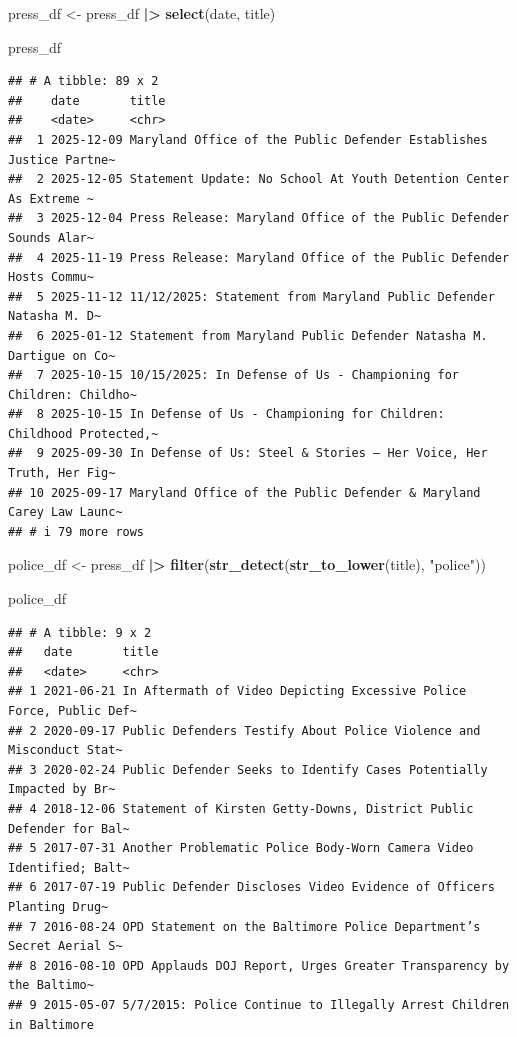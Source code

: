 \documentclass[
]{article}
\newenvironment{Shaded}{\begin{snugshade}}{\end{snugshade}}
\newcommand{\FunctionTok}[1]{\textcolor[rgb]{0.13,0.29,0.53}{\textbf{#1}}}
\newcommand{\NormalTok}[1]{#1}
\newcommand{\OtherTok}[1]{\textcolor[rgb]{0.56,0.35,0.01}{#1}}
\newcommand{\SpecialCharTok}[1]{\textcolor[rgb]{0.81,0.36,0.00}{\textbf{#1}}}
\newcommand{\StringTok}[1]{\textcolor[rgb]{0.31,0.60,0.02}{#1}}
\begin{document}
\begin{Shaded}
\begin{Highlighting}[]
\NormalTok{press\_df }\OtherTok{\textless{}{-}}\NormalTok{ press\_df }\SpecialCharTok{|\textgreater{}} \FunctionTok{select}\NormalTok{(date, title)}

\NormalTok{press\_df}
\end{Highlighting}
\end{Shaded}

\begin{verbatim}
## # A tibble: 89 x 2
##    date       title                                                             
##    <date>     <chr>                                                             
##  1 2025-12-09 Maryland Office of the Public Defender Establishes Justice Partne~
##  2 2025-12-05 Statement Update: No School At Youth Detention Center As Extreme ~
##  3 2025-12-04 Press Release: Maryland Office of the Public Defender Sounds Alar~
##  4 2025-11-19 Press Release: Maryland Office of the Public Defender Hosts Commu~
##  5 2025-11-12 ​11/12/2025: Statement from Maryland Public Defender Natasha M. D~ 
##  6 2025-01-12 Statement from Maryland Public Defender Natasha M. Dartigue on Co~
##  7 2025-10-15 ​10/15/2025: In Defense of Us - Championing for Children: Childho~ 
##  8 2025-10-15 In Defense of Us - Championing for Children: Childhood Protected,~
##  9 2025-09-30 In Defense of Us: Steel & Stories – Her Voice, Her Truth, Her Fig~
## 10 2025-09-17 Maryland Office of the Public Defender & Maryland Carey Law Launc~
## # i 79 more rows
\end{verbatim}

\begin{Shaded}
\begin{Highlighting}[]
\NormalTok{police\_df }\OtherTok{\textless{}{-}}\NormalTok{ press\_df }\SpecialCharTok{|\textgreater{}}
  \FunctionTok{filter}\NormalTok{(}\FunctionTok{str\_detect}\NormalTok{(}\FunctionTok{str\_to\_lower}\NormalTok{(title), }\StringTok{"police"}\NormalTok{))}

\NormalTok{police\_df}
\end{Highlighting}
\end{Shaded}

\begin{verbatim}
## # A tibble: 9 x 2
##   date       title                                                              
##   <date>     <chr>                                                              
## 1 2021-06-21 In Aftermath of Video Depicting Excessive Police Force, Public Def~
## 2 2020-09-17 Public Defenders Testify About Police Violence and Misconduct Stat~
## 3 2020-02-24 Public Defender Seeks to Identify Cases Potentially Impacted by Br~
## 4 2018-12-06 Statement of Kirsten Getty-Downs, District Public Defender for Bal~
## 5 2017-07-31 Another Problematic Police Body-Worn Camera Video Identified; Balt~
## 6 2017-07-19 Public Defender Discloses Video Evidence of Officers Planting Drug~
## 7 2016-08-24 OPD Statement on the Baltimore Police Department’s Secret Aerial S~
## 8 2016-08-10 OPD Applauds DOJ Report, Urges Greater Transparency by the Baltimo~
## 9 2015-05-07 ​5/7/2015: Police Continue to Illegally Arrest Children in Baltimore
\end{verbatim}
\end{document}
